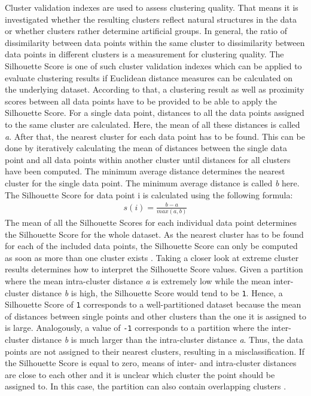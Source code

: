 Cluster validation indexes are used to assess clustering quality. That means it is investigated whether the resulting clusters reflect natural structures in the data or whether clusters rather determine artificial groups. In general, the ratio of dissimilarity between data points within the same cluster to dissimilarity between data points in different clusters is a measurement for clustering quality. 
The Silhouette Score is one of such cluster validation indexes which can be applied to evaluate clustering results if Euclidean distance measures can be calculated on the underlying dataset. According to that, a clustering result as well as proximity scores between all data points have to be provided to be able to apply the Silhouette Score. 
For a single data point, distances to all the data points assigned to the same cluster are calculated. Here, the mean of all these distances is called \textit{a}. After that, the nearest cluster for each data point has to be found. This can be done by iteratively calculating the mean of distances between the single data point and all data points within another cluster until distances for all clusters have been computed. The minimum average distance determines the nearest cluster for the single data point. 
The minimum average distance is called \textit{b} here. The Silhouette Score for data point i is calculated using the following formula:
\begin{align*}
	s(i)=\frac{b - a}{max(a, b)}
\end{align*}
The mean of all the Silhouette Scores for each individual data point determines the Silhouette Score for the whole dataset. As the nearest cluster has to be found for each of the included data points, the Silhouette Score can only be computed as soon as more than one cluster exists \cite{rousseeuw1987silhouettes}.
Taking a closer look at extreme cluster results determines how to interpret the Silhouette Score values. Given a partition where the mean intra-cluster distance \textit{a} is extremely low while the mean inter-cluster distance \textit{b} is high, the Silhouette Score would tend to be \texttt{1}. Hence, a Silhouette Score of \texttt{1} corresponds to a well-partitioned dataset because the mean of distances between single points and other clusters than the one it is assigned to is large. Analogously, a value of \texttt{-1} corresponds to a partition where the inter-cluster distance \textit{b} is much larger than the intra-cluster distance \textit{a}. Thus, the data points are not assigned to their nearest clusters, resulting in a misclassification. If the Silhouette Score is equal to zero, means of inter- and intra-cluster distances are close to each other and it is unclear which cluster the point should be assigned to. In this case, the partition can also contain overlapping clusters \cite{rousseeuw1987silhouettes}.
